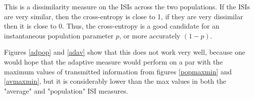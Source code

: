 This is a dissimilarity measure on the ISIs across the two populations.  If the ISIs are very similar, then the cross-entropy is close to 1, if they are very dissimilar then it is close to 0.  Thus, the cross-entropy is a good candidate for an instantaneous population parameter $p$, or more accurately $(1-p)$.

Figures \ref{adpop} and \ref{adav} show that this does not work very well, because one would hope that the adaptive measure would perform on a par with the maximum values of transmitted information from figures \ref{popmaxmin} and \ref{avmaxmin}, but it is considerably lower than the max values in both the "average" and "population" ISI measures.

\begin{figure}

\end{figure}

\begin{figure}

\end{figure}

%
%
%
